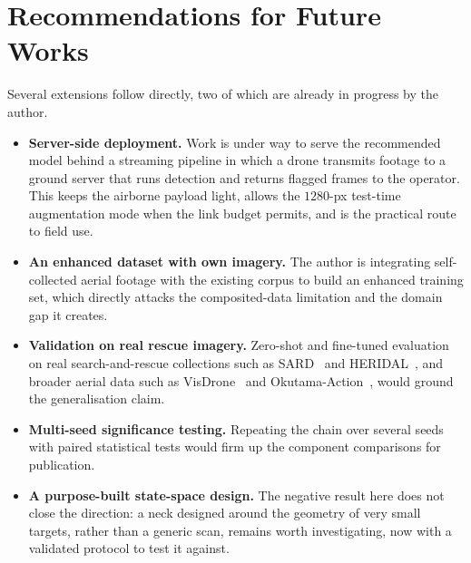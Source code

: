 \section{Recommendations for Future Works}
Several extensions follow directly, two of which are already in progress by
the author.
\begin{itemize}
  \item \textbf{Server-side deployment.} Work is under way to serve the
        recommended model behind a streaming pipeline in which a drone
        transmits footage to a ground server that runs detection and returns
        flagged frames to the operator. This keeps the airborne payload
        light, allows the $1280$-px test-time augmentation mode when the
        link budget permits, and is the practical route to field use.
  \item \textbf{An enhanced dataset with own imagery.} The author is
        integrating self-collected aerial footage with the existing corpus
        to build an enhanced training set, which directly attacks the
        composited-data limitation and the domain gap it creates.
  \item \textbf{Validation on real rescue imagery.} Zero-shot and fine-tuned
        evaluation on real search-and-rescue collections such as
        SARD~\cite{sambolek2021sard} and HERIDAL~\cite{bozic2019heridal},
        and broader aerial data such as VisDrone~\cite{zhu2021visdrone} and
        Okutama-Action~\cite{barekatain2017okutama}, would ground the
        generalisation claim.
  \item \textbf{Multi-seed significance testing.} Repeating the chain over
        several seeds with paired statistical tests would firm up the
        component comparisons for publication.
  \item \textbf{A purpose-built state-space design.} The negative result
        here does not close the direction: a neck designed around the
        geometry of very small targets, rather than a generic scan, remains
        worth investigating, now with a validated protocol to test it
        against.
\end{itemize}

